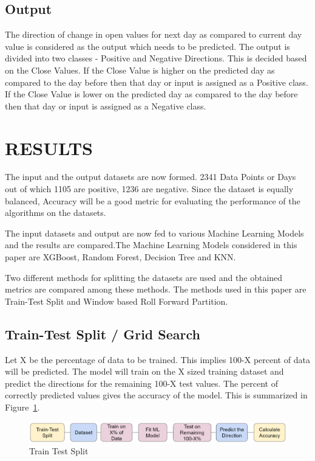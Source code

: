 \documentclass[preprint,12pt]{elsarticle}
\begin{document}
\subsection{Output}

The direction of change in open values for next day as compared to current day value is considered as the output which needs to be predicted. The output is divided into two classes - Positive and Negative Directions. This is decided based on the Close Values. If the Close Value is higher on the predicted day as compared to the day before then that day or input is assigned as a Positive class. If the Close Value is lower on the predicted day as compared to the day before then that day or input is assigned as a Negative class.

\section{RESULTS}
The input and the output datasets are now formed. 2341 Data Points or Days out of which 1105 are positive, 1236 are negative. Since the dataset is equally balanced, Accuracy will be a good metric for evaluating the performance of the algorithms on the datasets.

The input datasets and output are now fed to various Machine Learning Models and the results are compared.The Machine Learning Models considered in this paper are XGBoost, Random Forest, Decision Tree and KNN.

Two different methods for splitting the datasets are used and the obtained metrics are compared among these methods. The methods used in this paper are Train-Test Split and Window based Roll Forward Partition.


\subsection{Train-Test Split / Grid Search}




Let X be the percentage of data to be trained. This implies 100-X percent of data will be predicted. The model will train on the X sized training dataset and predict the directions for the remaining 100-X test values. The percent of correctly predicted values gives the accuracy of the model. This is summarized in Figure~\ref{fig:train_test_split}.

\begin{figure}[H]
\centering
\includegraphics[width=390pt,keepaspectratio]{Train_Test_Split.eps}
\caption{\label{fig:train_test_split} Train Test Split}
\end{figure}
\end{document}
